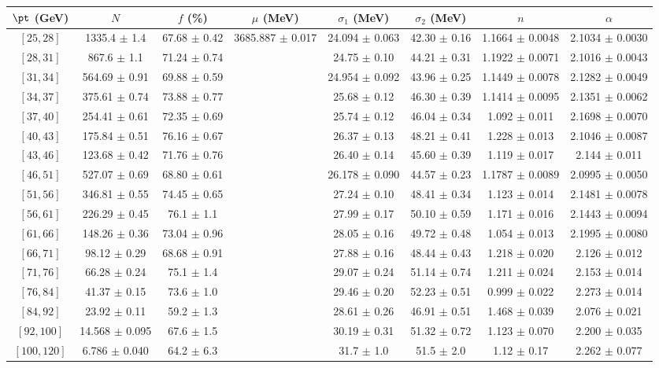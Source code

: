 \begin{tabular}{c||c|c|c|c|c|c|c}
$\pt$ (GeV) & $N$ & $f$ (\%) & $\mu$ (MeV) & $\sigma_1$ (MeV) & $\sigma_2$ (MeV) & $n$ & $\alpha$ \\
\hline
$[25, 28]$ & 1335.4 $\pm$ 1.4 & 67.68 $\pm$ 0.42 & \multirow{17}{*}{3685.887 $\pm$ 0.017} & 24.094 $\pm$ 0.063 & 42.30 $\pm$ 0.16 & 1.1664 $\pm$ 0.0048 & 2.1034 $\pm$ 0.0030\\
$[28, 31]$ & 867.6 $\pm$ 1.1 & 71.24 $\pm$ 0.74 &  & 24.75 $\pm$ 0.10 & 44.21 $\pm$ 0.31 & 1.1922 $\pm$ 0.0071 & 2.1016 $\pm$ 0.0043\\
$[31, 34]$ & 564.69 $\pm$ 0.91 & 69.88 $\pm$ 0.59 &  & 24.954 $\pm$ 0.092 & 43.96 $\pm$ 0.25 & 1.1449 $\pm$ 0.0078 & 2.1282 $\pm$ 0.0049\\
$[34, 37]$ & 375.61 $\pm$ 0.74 & 73.88 $\pm$ 0.77 &  & 25.68 $\pm$ 0.12 & 46.30 $\pm$ 0.39 & 1.1414 $\pm$ 0.0095 & 2.1351 $\pm$ 0.0062\\
$[37, 40]$ & 254.41 $\pm$ 0.61 & 72.35 $\pm$ 0.69 &  & 25.74 $\pm$ 0.12 & 46.04 $\pm$ 0.34 & 1.092 $\pm$ 0.011 & 2.1698 $\pm$ 0.0070\\
$[40, 43]$ & 175.84 $\pm$ 0.51 & 76.16 $\pm$ 0.67 &  & 26.37 $\pm$ 0.13 & 48.21 $\pm$ 0.41 & 1.228 $\pm$ 0.013 & 2.1046 $\pm$ 0.0087\\
$[43, 46]$ & 123.68 $\pm$ 0.42 & 71.76 $\pm$ 0.76 &  & 26.40 $\pm$ 0.14 & 45.60 $\pm$ 0.39 & 1.119 $\pm$ 0.017 & 2.144 $\pm$ 0.011\\
$[46, 51]$ & 527.07 $\pm$ 0.69 & 68.80 $\pm$ 0.61 &  & 26.178 $\pm$ 0.090 & 44.57 $\pm$ 0.23 & 1.1787 $\pm$ 0.0089 & 2.0995 $\pm$ 0.0050\\
$[51, 56]$ & 346.81 $\pm$ 0.55 & 74.45 $\pm$ 0.65 &  & 27.24 $\pm$ 0.10 & 48.41 $\pm$ 0.34 & 1.123 $\pm$ 0.014 & 2.1481 $\pm$ 0.0078\\
$[56, 61]$ & 226.29 $\pm$ 0.45 & 76.1 $\pm$ 1.1 &  & 27.99 $\pm$ 0.17 & 50.10 $\pm$ 0.59 & 1.171 $\pm$ 0.016 & 2.1443 $\pm$ 0.0094\\
$[61, 66]$ & 148.26 $\pm$ 0.36 & 73.04 $\pm$ 0.96 &  & 28.05 $\pm$ 0.16 & 49.72 $\pm$ 0.48 & 1.054 $\pm$ 0.013 & 2.1995 $\pm$ 0.0080\\
$[66, 71]$ & 98.12 $\pm$ 0.29 & 68.68 $\pm$ 0.91 &  & 27.88 $\pm$ 0.16 & 48.44 $\pm$ 0.43 & 1.218 $\pm$ 0.020 & 2.126 $\pm$ 0.012\\
$[71, 76]$ & 66.28 $\pm$ 0.24 & 75.1 $\pm$ 1.4 &  & 29.07 $\pm$ 0.24 & 51.14 $\pm$ 0.74 & 1.211 $\pm$ 0.024 & 2.153 $\pm$ 0.014\\
$[76, 84]$ & 41.37 $\pm$ 0.15 & 73.6 $\pm$ 1.0 &  & 29.46 $\pm$ 0.20 & 52.23 $\pm$ 0.51 & 0.999 $\pm$ 0.022 & 2.273 $\pm$ 0.014\\
$[84, 92]$ & 23.92 $\pm$ 0.11 & 59.2 $\pm$ 1.3 &  & 28.61 $\pm$ 0.26 & 46.91 $\pm$ 0.51 & 1.468 $\pm$ 0.039 & 2.076 $\pm$ 0.021\\
$[92, 100]$ & 14.568 $\pm$ 0.095 & 67.6 $\pm$ 1.5 &  & 30.19 $\pm$ 0.31 & 51.32 $\pm$ 0.72 & 1.123 $\pm$ 0.070 & 2.200 $\pm$ 0.035\\
$[100, 120]$ & 6.786 $\pm$ 0.040 & 64.2 $\pm$ 6.3 &  & 31.7 $\pm$ 1.0 & 51.5 $\pm$ 2.0 & 1.12 $\pm$ 0.17 & 2.262 $\pm$ 0.077\\
\end{tabular}
